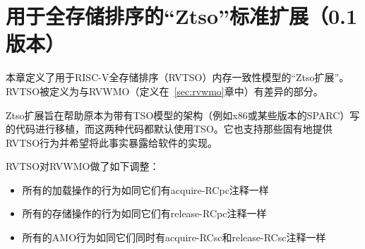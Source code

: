 \chapter{用于全存储排序的“Ztso”标准扩展（0.1版本）}
\label{sec:ztso}

本章定义了用于RISC-V全存储排序（RVTSO）内存一致性模型的“Ztso扩展”。RVTSO被定义为与RVWMO（定义在~\ref{sec:rvwmo}章中）有差异的部分。

\begin{commentary}
  Ztso扩展旨在帮助原本为带有TSO模型的架构（例如x86或某些版本的SPARC）写的代码进行移植，而这两种代码都默认使用TSO。它也支持那些固有地提供RVTSO行为并希望将此事实暴露给软件的实现。
\end{commentary}

RVTSO对RVWMO做了如下调整：

\begin{itemize}
  \item 所有的加载操作的行为如同它们有acquire-RCpc注释一样  %
  \item 所有的存储操作的行为如同它们有release-RCpc注释一样  %
  \item 所有的AMO行为如同它们同时有acquire-RCsc和release-RCsc注释一样  %
\end{itemize}

